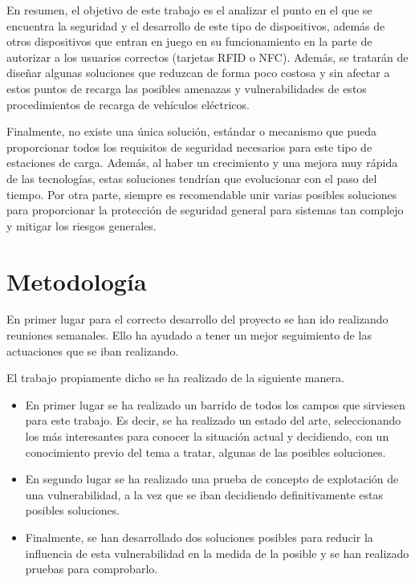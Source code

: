 \documentclass[12pt,a4paper,onecolumn,oneside]{report}
\begin{document}
En resumen, el objetivo de este trabajo es el analizar el punto en el que se encuentra la seguridad y el desarrollo de este tipo de dispositivos, además de otros dispositivos que entran en juego en su funcionamiento en la parte de autorizar a los usuarios correctos (tarjetas RFID o NFC). Además, se tratarán de diseñar algunas soluciones que reduzcan de forma poco costosa y sin afectar a estos puntos de recarga las posibles amenazas y vulnerabilidades de estos procedimientos de recarga de vehículos eléctricos.

Finalmente, no existe una única solución, estándar o mecanismo que pueda proporcionar todos los requisitos de seguridad necesarios para este tipo de estaciones de carga. Además, al haber un crecimiento y una mejora muy rápida de las tecnologías, estas soluciones tendrían que evolucionar con el paso del tiempo. Por otra parte, siempre es recomendable unir varias posibles soluciones para proporcionar la protección de seguridad general para sistemas tan complejo y mitigar los riesgos generales.



\section*{Metodología}

En primer lugar para el correcto desarrollo del proyecto se han ido realizando reuniones semanales. Ello ha ayudado a tener un mejor seguimiento de las actuaciones que se iban realizando.

El trabajo propiamente dicho se ha realizado de la siguiente manera.
\begin{itemize}
\item En primer lugar se ha realizado un barrido de todos los campos que sirviesen para este trabajo. Es decir, se ha realizado un estado del arte, seleccionando los más interesantes para conocer la situación actual y decidiendo, con un conocimiento previo del tema a tratar, algunas de las posibles soluciones.
\item En segundo lugar se ha realizado una prueba de concepto de explotación de una vulnerabilidad, a la vez que se iban decidiendo definitivamente estas posibles soluciones.
\item Finalmente, se han desarrollado dos soluciones posibles para reducir la influencia de esta vulnerabilidad en la medida de la posible y se han realizado pruebas para comprobarlo.
\end{itemize}
\end{document}
